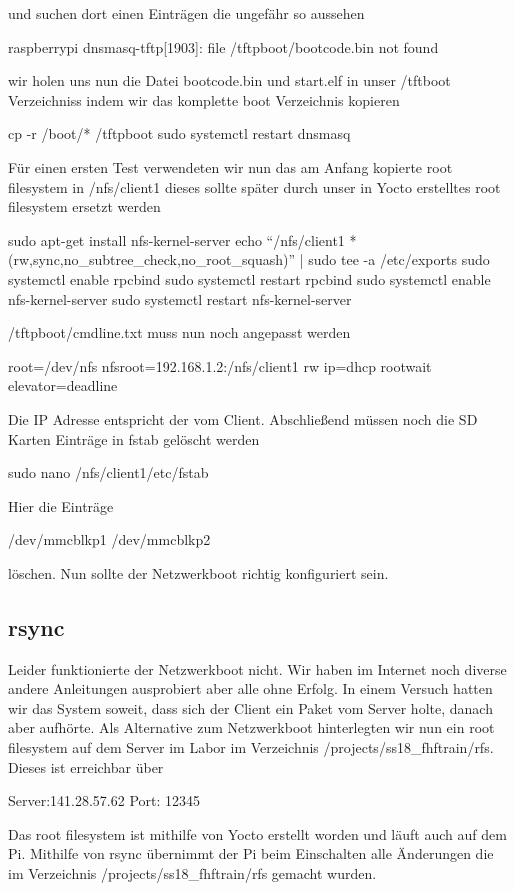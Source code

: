 \documentclass[a4paper,10pt] {article}
\begin{document}
			und suchen dort einen Einträgen die ungefähr so aussehen
			
			raspberrypi dnsmasq-tftp[1903]: file /tftpboot/bootcode.bin not found
			
			wir holen uns nun die Datei bootcode.bin und start.elf in unser /tftboot Verzeichniss indem wir das komplette boot Verzeichnis kopieren
			
			cp -r /boot/* /tftpboot
			sudo systemctl restart dnsmasq
			
			Für einen ersten Test verwendeten wir nun das am Anfang kopierte root filesystem in /nfs/client1 dieses sollte später durch unser in Yocto erstelltes root filesystem ersetzt werden
			
			sudo apt-get install nfs-kernel-server
			echo ``/nfs/client1 *(rw,sync,no\_subtree\_check,no\_root\_squash)'' | sudo tee -a /etc/exports
			sudo systemctl enable rpcbind
			sudo systemctl restart rpcbind
			sudo systemctl enable nfs-kernel-server
			sudo systemctl restart nfs-kernel-server
			
			/tftpboot/cmdline.txt muss nun noch angepasst werden
			
			root=/dev/nfs nfsroot=192.168.1.2:/nfs/client1 rw ip=dhcp rootwait elevator=deadline
			
			Die IP Adresse entspricht der vom Client. Abschließend müssen noch die SD Karten Einträge in fstab gelöscht werden
			
			sudo nano /nfs/client1/etc/fstab
			
			Hier die Einträge 
			
			/dev/mmcblkp1
			/dev/mmcblkp2
			
			löschen. Nun sollte der Netzwerkboot richtig konfiguriert sein.
			
		\vfill
		
		\subsection{rsync}
			Leider funktionierte der Netzwerkboot nicht. Wir haben im Internet noch diverse andere Anleitungen ausprobiert aber alle ohne Erfolg. In einem Versuch hatten wir das System soweit, dass sich der Client ein Paket vom Server holte, danach aber aufhörte. Als Alternative zum Netzwerkboot hinterlegten wir nun ein root filesystem auf dem Server im Labor im Verzeichnis /projects/ss18\_fhftrain/rfs. Dieses ist erreichbar über 
			
			Server:141.28.57.62 
			Port: 12345
			
			Das root filesystem ist mithilfe von Yocto erstellt worden und läuft auch auf dem Pi. Mithilfe von rsync übernimmt der Pi beim Einschalten alle Änderungen die im Verzeichnis /projects/ss18\_fhftrain/rfs gemacht wurden. 
			
\end{document}
